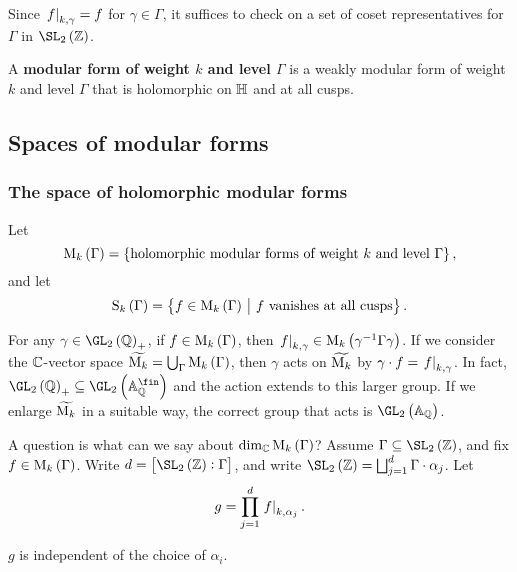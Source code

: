 \begin{note*}
Since $ \left. f \right|_{k, \gamma} = f $ for $ \gamma \in \Gamma $, it suffices to check on a set of coset representatives for $ \Gamma $ in $ \SL_2\br{\ZZ} $.
\end{note*}

\begin{definition}
A \textbf{modular form of weight $ k $ and level $ \Gamma $} is a weakly modular form of weight $ k $ and level $ \Gamma $ that is holomorphic on $ \mathbb{H} $ and at all cusps.
\end{definition}

\pagebreak

\subsection{Spaces of modular forms}

\subsubsection{The space of holomorphic modular forms}


Let
$$ \M_k\br{\Gamma} = \cbr{\text{holomorphic modular forms of weight} \ k \ \text{and level} \ \Gamma}, $$
and let
$$ \S_k\br{\Gamma} = \cbr{f \in \M_k\br{\Gamma} \st f \ \text{vanishes at all cusps}}. $$

\begin{note*}
For any $ \gamma \in \GL_2\br{\QQ}_+ $, if $ f \in \M_k\br{\Gamma} $, then $ \eval{f}_{k, \gamma} \in \M_k\br{\gamma^{-1}\Gamma\gamma} $. If we consider the $ \mathbb{C} $-vector space $ \widetilde{\M_k} = \bigcup_\Gamma \M_k\br{\Gamma} $, then $ \gamma $ acts on $ \widetilde{\mathrm{M}_k} $ by $ \gamma \cdot f = \left. f \right|_{k, \gamma} $. In fact, $ \GL_2\br{\QQ}_+ \subseteq \GL_2\br{\AA_\QQ^{\fin}} $ and the action extends to this larger group. If we enlarge $ \widetilde{\mathrm{M}_k} $ in a suitable way, the correct group that acts is $ \GL_2\br{\AA_\QQ} $.
\end{note*}

A question is what can we say about $ \dim_\CC \M_k\br{\Gamma} $? Assume $ \Gamma \subseteq \SL_2\br{\ZZ} $, and fix $ f \in \M_k\br{\Gamma} $. Write $ d = \sbr{\SL_2\br{\ZZ} : \Gamma} $, and write $ \SL_2\br{\ZZ} = \bigsqcup_{j = 1}^d \Gamma \cdot \alpha_j $. Let
$$ g = \prod_{j = 1}^d \left. f \right|_{k, \alpha_j}. $$

\begin{proposition}
$ g $ is independent of the choice of $ \alpha_i $.
\end{proposition}

